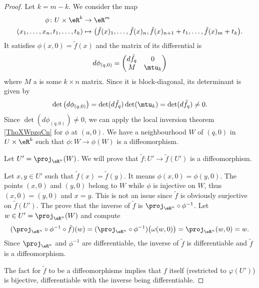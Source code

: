 \begin{proof}
	Let \( k=m-k\). We consider the map
	\begin{equation}
		\begin{aligned}
			\phi\colon U\times \eR^k          & \to \eR^m                                                                                                \\
			(x_1,\ldots, x_n,t_1,\ldots, t_k) & \mapsto \big( \tilde f(x)_1,\ldots, \tilde f(x)_n,\tilde f(x)_{n+1}+t_1,\ldots, \tilde f(x)_m+t_k \big).
		\end{aligned}
	\end{equation}
	It satisfies \( \phi(x,0)=\tilde f(x)\) and the matrix of its differential is
	\begin{equation}
		d\phi_{(q,0)}=\begin{pmatrix}
			d\tilde f_q & 0      \\
			M           & \mtu_k
		\end{pmatrix}
	\end{equation}
	where \( M\) a is some \( k\times n\) matrix. Since it is block-diagonal, its determinant is given by
	\begin{equation}
		\det\big( d\phi_{(q,0)} \big)=\det(d\tilde f_q)\det(\mtu_k)=\det(d\tilde f_q)\neq 0.
	\end{equation}
	Since \( \det(d\phi_{(q,0)})\neq 0\), we can apply the local inversion theorem \ref{ThoXWpzqCn} for \( \phi\) at \( (a,0)\). We have a neighbourhood \( W\) of \( (q,0)\) in \( U\times \eR^k\) such that \( \phi\colon W\to \phi(W)\) is a diffeomorphism.

	Let \( U'=\proj_{\eR^n}(W)\). We will prove that \( \tilde f\colon U'\to \tilde f(U')\) is a diffeomorphism.
	\begin{subproof}
		\spitem[Injective]
		Let \( x,y\in U'\) such that \( \tilde f(x)=\tilde f(y)\). It means \( \phi(x,0)=\phi(y,0)\). The points \( (x,0)\) and \( (y,0)\) belong to \( W\) while \( \phi\) is injective on \( W\), thus \( (x,0)=(y,0)\) and \( x=y\).
		\spitem[Surjective]
		This is not an issue since \( \tilde f\) is obviously surjective on \( \tilde f(U')\).
		The prove that the inverse of \( \tilde f\) is \( \proj_{\eR^n}\circ \phi^{-1}\). Let \( w\in U'=\proj_{\eR^n}(W)\) and compute
		\begin{equation}
			(\proj_{\eR^n}\circ \phi^{-1}\circ\tilde f)(w)=(\proj_{\eR^n}\circ\phi^{-1})\big( \omega(w,0) \big)=\proj_{\eR^n}(w,0)=w.
		\end{equation}
		\spitem[Diffeomorphism]
		Since \( \proj_{\eR^n}\) and \( \phi^{-1}\) are differentiable, the inverse of \( \tilde f\) is differentiable and \( \tilde f\) is a diffeomorphism.
	\end{subproof}
	The fact for \( \tilde f\) to be a diffeomorphisms implies that \( f\) itself (restricted to \( \varphi(U')\)) is bijective, differentiable with the inverse being differentiable.
\end{proof}

